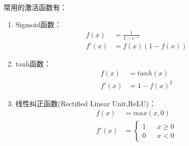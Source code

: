 \documentclass[a4paper]{ctexart}
\begin{document}
\begin{spacing}{1.3}
	常用的激活函数有：
	\begin{enumerate}[itemindent=2em,label=(\arabic*)]
		\item Sigmoid函数\cite{RN115}：
		\begin{equation}
			\begin{split}
				f(x)&=\frac{1}{1-e^{-x}}\\
				f'(x)&=f(x)(1-f(x))
			\end{split}
		\end{equation}
		\item tanh函数\cite{RN116}：
		\begin{equation}
			\begin{split}
				f(x)&=tanh(x)\\
				f'(x)&=1-f(x)^2
			\end{split}
		\end{equation}
		\item 线性纠正函数(Rectified Linear Unit,ReLU)\cite{RN118}：
		\begin{equation}
			\begin{split}
				f(x)&=max(x,0)\\
				f'(x)&=\left\{
					\begin{aligned}
						1&&x\geq0\\
						0&&x<0
					\end{aligned}
					\right.
			\end{split}
		\end{equation}
	\end{enumerate}


\end{spacing}
\end{document}
